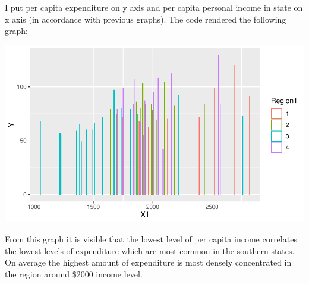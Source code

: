 \documentclass[12pt,letterpaper]{article}
\begin{document}
\begin{enumerate}
	  
	
	I put per capita expenditure on y axis and per capita personal income in state on x axis (in accordance with previous graphs). The code rendered the following graph:
	
	\includegraphics{Ggplot}
	
	From this graph it is visible that the lowest level of per capita income correlates the lowest levels of expenditure which are most common in the southern states. On average the highest amount of expenditure is most densely concentrated in the region around \$2000 income level.    
	
	   
	
	
\end{enumerate}
\end{document}
